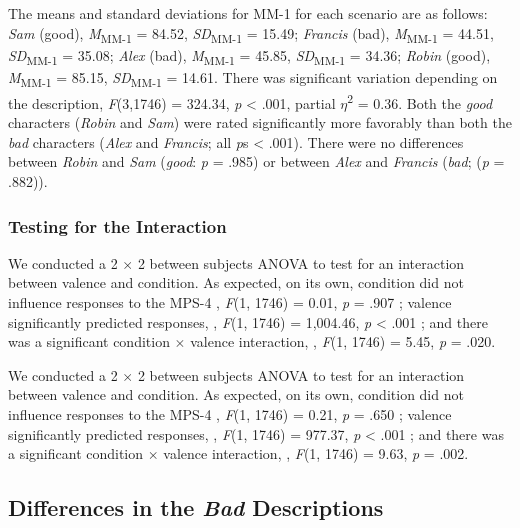 \documentclass[
  english,
  man,floatsintext]{apa7}
\begin{document}
The means and standard deviations for MM-1 for each scenario are as follows:
\emph{Sam} (good),
\emph{M}\textsubscript{MM-1} = 84.52, \emph{SD}\textsubscript{MM-1} = 15.49;
\emph{Francis} (bad),
\emph{M}\textsubscript{MM-1} = 44.51, \emph{SD}\textsubscript{MM-1} = 35.08;
\emph{Alex} (bad),
\emph{M}\textsubscript{MM-1} = 45.85, \emph{SD}\textsubscript{MM-1} = 34.36;
\emph{Robin} (good),
\emph{M}\textsubscript{MM-1} = 85.15, \emph{SD}\textsubscript{MM-1} = 14.61. There was significant variation depending on the description, \emph{F}(3,1746) = 324.34, \emph{p} \textless{} .001, partial \(\eta\)\textsuperscript{2} = 0.36. Both the \emph{good} characters (\emph{Robin} and \emph{Sam}) were rated significantly more favorably than both the \emph{bad} characters (\emph{Alex} and \emph{Francis}; all \emph{p}s \textless{} .001). There were no differences between \emph{Robin} and \emph{Sam} (\emph{good}: \emph{p} = .985) or between \emph{Alex} and \emph{Francis} (\emph{bad}; (\emph{p} = .882)).

\hypertarget{testing-for-the-interaction}{%
\subsubsection{Testing for the Interaction}\label{testing-for-the-interaction}}

We conducted a 2 \(\times\) 2 between subjects ANOVA to test for an interaction between valence and condition.
As expected, on its own, condition did not influence responses to the MPS-4
, \emph{F}(1, 1746) = 0.01, \emph{p} = .907
; valence significantly predicted responses,
, \emph{F}(1, 1746) = 1,004.46, \emph{p} \textless{} .001
; and there was a significant condition \(\times\) valence interaction,
, \emph{F}(1, 1746) = 5.45, \emph{p} = .020.

We conducted a 2 \(\times\) 2 between subjects ANOVA to test for an interaction between valence and condition.
As expected, on its own, condition did not influence responses to the MPS-4
, \emph{F}(1, 1746) = 0.21, \emph{p} = .650
; valence significantly predicted responses,
, \emph{F}(1, 1746) = 977.37, \emph{p} \textless{} .001
; and there was a significant condition \(\times\) valence interaction,
, \emph{F}(1, 1746) = 9.63, \emph{p} = .002.

\hypertarget{differences-in-the-bad-descriptions-1}{%
\subsection{\texorpdfstring{Differences in the \emph{Bad} Descriptions}{Differences in the Bad Descriptions}}\label{differences-in-the-bad-descriptions-1}}
\end{document}
